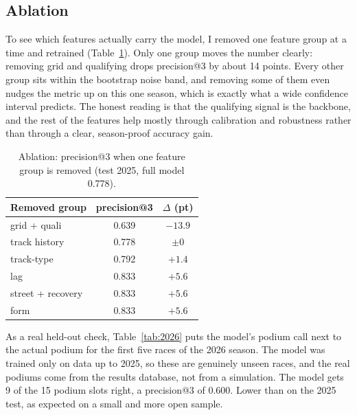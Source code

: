 \documentclass[10pt,twocolumn]{article}
\begin{document}
\subsection{Ablation}
To see which features actually carry the model, I removed one feature group at a
time and retrained (Table~\ref{tab:ablation}). Only one group moves the number
clearly: removing grid and qualifying drops precision@3 by about 14 points. Every
other group sits within the bootstrap noise band, and removing some of them even
nudges the metric up on this one season, which is exactly what a wide confidence
interval predicts. The honest reading is that the qualifying signal is the
backbone, and the rest of the features help mostly through calibration and
robustness rather than through a clear, season-proof accuracy gain.

\begin{table}[t]
\centering
\caption{Ablation: precision@3 when one feature group is removed (test 2025,
full model 0.778).}
\label{tab:ablation}
\small
\begin{tabular}{@{}lcc@{}}
\toprule
Removed group & precision@3 & $\Delta$ (pt) \\
\midrule
grid + quali      & 0.639 & $-13.9$ \\
track history     & 0.778 & $\pm0$ \\
track-type        & 0.792 & $+1.4$ \\
lag               & 0.833 & $+5.6$ \\
street + recovery & 0.833 & $+5.6$ \\
form              & 0.833 & $+5.6$ \\
\bottomrule
\end{tabular}
\end{table}

As a real held-out check, Table~\ref{tab:2026} puts the model's podium call next
to the actual podium for the first five races of the 2026 season. The model was
trained only on data up to 2025, so these are genuinely unseen races, and the
real podiums come from the results database, not from a simulation. The model
gets 9 of the 15 podium slots right, a precision@3 of 0.600. Lower than on the
2025 test, as expected on a small and more open sample.
\end{document}
